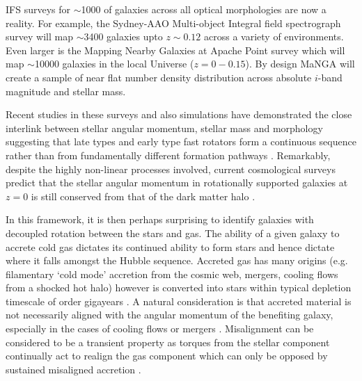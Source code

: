 \documentclass[fleqn,usenatbib]{mnras}
\begin{document}
IFS surveys for $\sim$1000 of galaxies across all optical morphologies are now a reality. For example, the Sydney-AAO  Multi-object  Integral  field  spectrograph  survey \citep[][]{croom2012, bryant2015} will map $\sim$3400 galaxies upto $z\sim0.12$ across a variety of environments. Even larger is the Mapping Nearby Galaxies at Apache Point \citep[MaNGA;][]{bundy2015, blanton2017} survey which will map $\sim$10000 galaxies in the local Universe ($z=0-0.15$). By design MaNGA will create a sample of near flat number density distribution across absolute $i$-band magnitude and stellar mass.

Recent studies in these surveys and also simulations have demonstrated the close interlink between stellar angular momentum, stellar mass and morphology suggesting that late types and early type fast rotators form a continuous sequence rather than from fundamentally different formation pathways \citep[][]{cortese2016, lagos2017, graham2018}. Remarkably, despite the highly non-linear processes involved, current cosmological surveys predict that the stellar angular momentum in rotationally supported galaxies at $z=0$ is still conserved from that of the dark matter halo \citep[e.g.][]{genel2015}. 

In this framework, it is then perhaps surprising to identify galaxies with decoupled rotation between the stars and gas. The ability of a given galaxy to accrete cold gas dictates its continued ability to form stars and hence dictate where it falls amongst the Hubble sequence. Accreted gas has many origins (e.g. filamentary `cold mode' accretion from the cosmic web, mergers, cooling flows from a shocked hot halo) however is converted into stars within typical depletion timescale of order gigayears \citep{davis2016}. A natural consideration is that accreted material is not necessarily aligned with the angular momentum of the benefiting galaxy, especially in the cases of cooling flows or mergers \citep[e.g.][]{davis2011, lagos2015}. Misalignment can be considered to be a transient property as torques from the stellar component continually act to realign the gas component which can only be opposed by sustained misaligned accretion \citep[][]{vdvoort2015, davis2016}. 
\end{document}
